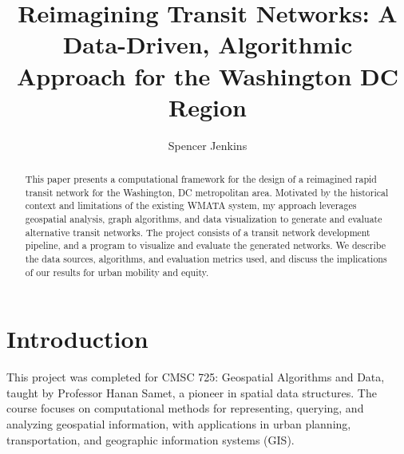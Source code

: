\documentclass[manuscript]{acmart}
\begin{document}
\title{Reimagining Transit Networks: A Data-Driven, Algorithmic Approach for the Washington DC Region}

\author{Spencer Jenkins}


\renewcommand{\shortauthors}{Trovato et al.}

\begin{abstract}
This paper presents a computational framework for the design of a reimagined rapid transit network for the Washington, DC metropolitan area. Motivated by the historical context and limitations of the existing WMATA system, my approach leverages geospatial analysis, graph algorithms, and data visualization to generate and evaluate alternative transit networks. The project consists of a transit network development pipeline, and a program to visualize and evaluate the generated networks. We describe the data sources, algorithms, and evaluation metrics used, and discuss the implications of our results for urban mobility and equity.
\end{abstract}

\maketitle



\section{Introduction}

This project was completed for CMSC 725: Geospatial Algorithms and Data, taught by Professor Hanan Samet, a pioneer in spatial data structures. The course focuses on computational methods for representing, querying, and analyzing geospatial information, with applications in urban planning, transportation, and geographic information systems (GIS).
\end{document}
